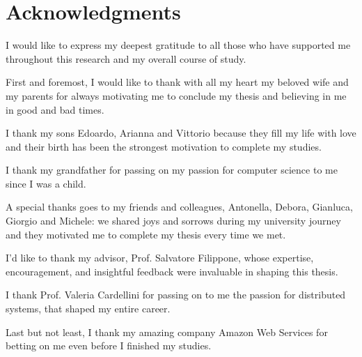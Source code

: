 


\chapter*{Acknowledgments}

I would like to express my deepest gratitude to all those who have supported me throughout this research and my overall course of study.

First and foremost, I would like to thank with all my heart my beloved wife and my parents for always motivating me to conclude my thesis and believing in me in good and bad times.

I thank my sons Edoardo, Arianna and Vittorio because they fill my life with love and their birth has been the strongest motivation to complete my studies.

I thank my grandfather for passing on my passion for computer science to me since I was a child.

A special thanks goes to my friends and colleagues, Antonella, Debora, Gianluca, Giorgio and Michele: we shared joys and sorrows during my university journey and they motivated me to complete my thesis every time we met.

I'd like to thank my advisor, Prof. Salvatore Filippone, whose expertise, encouragement, and insightful feedback were invaluable in shaping this thesis.

I thank Prof. Valeria Cardellini for passing on to me the passion for distributed systems, that shaped my entire career.

Last but not least, I thank my amazing company Amazon Web Services for betting on me even before I finished my studies.
